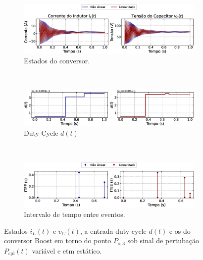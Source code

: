 \begin{figure}[H]
  \centering
  \captionsetup{justification=centering}
  \begin{subfigure}{1.\textwidth}
    \centering
    \includegraphics[width=1.\textwidth]{figuras/static-etm/boost/sim2/op1/result.eps}
    \caption{Estados do conversor.}
    \label{fig:boost_converter_variable_pcpl_static_etm_op1_duty_a}
  \end{subfigure}
  \\[6pt]
  \begin{subfigure}{1.\textwidth}
    \centering
    \includegraphics[width=1.\textwidth]{figuras/static-etm/boost/sim2/op1/duty-cycle.eps}
    \caption{Duty Cycle $d(t)$}
    \label{fig:boost_converter_variable_pcpl_static_etm_op1_duty_b}
  \end{subfigure}
  \\[6pt]
  \begin{subfigure}{1.\textwidth}
    \centering
    \includegraphics[width=1.\textwidth]{figuras/static-etm/boost/sim2/op1/inter-event-times.eps}
    \caption{Intervalo de tempo entre eventos.}
    \label{fig:boost_converter_variable_pcpl_static_etm_op1_duty_c}
  \end{subfigure}
  \caption{Estados $i_L(t)$ e $v_C(t)$, a entrada duty cycle $d(t)$ e os  do conversor Boost em torno do ponto $P_{\mathrm{o}, 3}$ sob sinal de pertubação $P_{\mathrm{cpl}}(t)$ variável e \acrshort{etm} estático.}
\end{figure}

